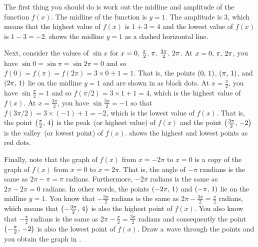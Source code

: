 \documentclass[a4paper,oneside,12pt]{article}
\begin{document}
\begin{solution}
The first thing you should do is work out the midline and amplitude of
the function $f(x)$.  The midline of the function is $y = 1$.  The
amplitude is $3$, which means that the highest value of $f(x)$ is
$1 + 3 = 4$ and the lowest value of $f(x)$ is $1 - 3 = -2$.
 shows the midline
$y = 1$ as a dashed horizontal line.

Next, consider the values of $\sin x$ for
$x = {0},\, {\frac{\pi}{2}},\, {\pi},\, {\frac{3\pi}{2}},\, {2\pi}$.  At
$x = {0},\, {\pi},\, {2\pi}$, you have
$\sin 0 = \sin \pi = \sin 2\pi = 0$ and so
$f(0) = f(\pi) = f(2\pi) = 3 \times 0 + 1 = 1$.  That is, the points
$\left\lparen{0},\, {1}\right\rparen$, $\left\lparen{\pi},\, {1}\right\rparen$, and $\left\lparen{2\pi},\, {1}\right\rparen$ lie on the
midline $y = 1$ and are shown in
 as black dots.  At
$x = \frac{\pi}{2}$, you have $\sin \frac{\pi}{2} = 1$ and so
$f(\pi/2) = 3 \times 1 + 1 = 4$, which is the highest value of
$f(x)$.  At $x = \frac{3\pi}{2}$, you have
$\sin \frac{3\pi}{2} = -1$ so that
$f(3\pi / 2) = 3 \times (-1) + 1 = -2$, which is the lowest value of
$f(x)$.  That is, the point $\left\lparen{\frac{\pi}{2}},\, {4}\right\rparen$ is the peak~(or
highest value) of $f(x)$ and the point
$\left\lparen{\frac{3\pi}{2}},\, {-2}\right\rparen$ is the valley~(or lowest point) of
$f(x)$.   shows the highest and
lowest points as red dots.

Finally, note that the graph of $f(x)$ from $x = -2\pi$ to
$x = 0$ is a copy of the graph of $f(x)$ from $x = 0$ to $x = 2\pi$.
That is, the angle of $-\pi$ randians is the same as
$2\pi - \pi = \pi$ radians.  Furthermore, $-2\pi$ radians is the same
as $2\pi - 2\pi = 0$ radians.  In other words, the points
$\left\lparen{-2\pi},\, {1}\right\rparen$ and $\left\lparen{-\pi},\, {1}\right\rparen$ lie on the midline
$y = 1$.  You know that $-\frac{3\pi}{2}$ radians is the same as
$2\pi - \frac{3\pi}{2} = \frac{\pi}{2}$ radians, which means that
$\left\lparen{-\frac{3\pi}{2}},\, {4}\right\rparen$ is also the highest point of $f(x)$.  You
also know that $-\frac{\pi}{2}$ radians is the same as
$2\pi - \frac{\pi}{2} = \frac{3\pi}{2}$ radians and consequently the
point $\left\lparen{-\frac{\pi}{2}},\, {-2}\right\rparen$ is also the lowest point of
$f(x)$.  Draw a wave through the points and you obtain the graph in
.
\end{solution}
\end{document}
